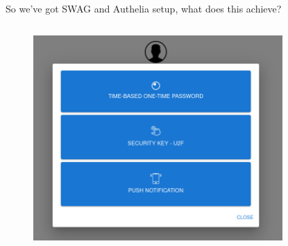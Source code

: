 \documentclass{beamer}
\begin{document}
\begin{frame}
    \begin{center}
        So we've got SWAG and Authelia setup, what does this achieve?    
    \end{center}
    \vspace{5mm}\par\noindent
    \begin{columns}
        \begin{column}{0.5\textwidth}
            \begin{figure}
                \centering
                \includegraphics[width=\textwidth,keepaspectratio]{../resources/2fa_options.png}
            \end{figure}
        \end{column}
        \begin{column}{0.5\textwidth}
            \begin{figure}
                \centering

\end{figure}
\end{column}
\end{columns}
\end{frame}
\end{document}
